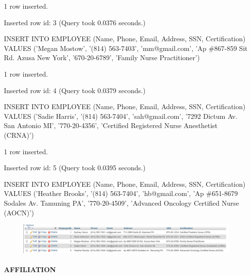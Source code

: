 \documentclass[11pt]{article}
\makeatletter
\def\maxwidth{\ifdim\Gin@nat@width>\linewidth\linewidth
    \else\Gin@nat@width\fi}
\let\Oldincludegraphics\includegraphics
\renewcommand{\includegraphics}[1]{\Oldincludegraphics[width=.8\maxwidth]{#1}}
\makeatother
\begin{document}
1 row inserted.

Inserted row id: 3 (Query took 0.0376 seconds.)

INSERT INTO EMPLOYEE (Name, Phone, Email, Address, SSN, Certification)
VALUES ('Megan Mostow', '(814) 563-7403', 'mm@gmail.com', 'Ap \#867-859
Sit Rd. Azusa New York', '670-20-6789', 'Family Nurse Practitioner')

1 row inserted.

Inserted row id: 4 (Query took 0.0379 seconds.)

INSERT INTO EMPLOYEE (Name, Phone, Email, Address, SSN, Certification)
VALUES ('Sadie Harris', '(814) 563-7404', 'sah@gmail.com', '7292 Dictum
Av. San Antonio MI', '770-20-4356', 'Certified Registered Nurse
Anesthetist (CRNA)')

1 row inserted.

Inserted row id: 5 (Query took 0.0395 seconds.)

INSERT INTO EMPLOYEE (Name, Phone, Email, Address, SSN, Certification)
VALUES ('Heather Brooks', '(814) 563-7404', 'hb@gmail.com', 'Ap
\#651-8679 Sodales Av. Tamuning PA', '770-20-4509', 'Advanced Oncology
Certified Nurse (AOCN)')

    \begin{figure}[H]
\centering
\includegraphics{employee_2.png}
\caption{}
\end{figure}

    \paragraph{AFFILIATION}\label{affiliation}
\end{document}
